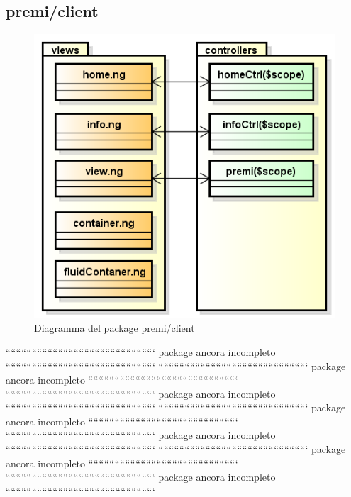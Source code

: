 \clearpage
\subsection{premi/client}
\begin{figure}[h]
\begin{center}
\includegraphics[scale=0.90]{img/diapkg/client.png}
\caption{Diagramma del package premi/client}
\end{center}
\end{figure}

`````````````````````````````````````````````````````````
package ancora incompleto
`````````````````````````````````````````````````````````
`````````````````````````````````````````````````````````
package ancora incompleto
`````````````````````````````````````````````````````````
`````````````````````````````````````````````````````````
package ancora incompleto
`````````````````````````````````````````````````````````
`````````````````````````````````````````````````````````
package ancora incompleto
`````````````````````````````````````````````````````````
`````````````````````````````````````````````````````````
package ancora incompleto
`````````````````````````````````````````````````````````
`````````````````````````````````````````````````````````
package ancora incompleto
`````````````````````````````````````````````````````````
`````````````````````````````````````````````````````````
package ancora incompleto
`````````````````````````````````````````````````````````
